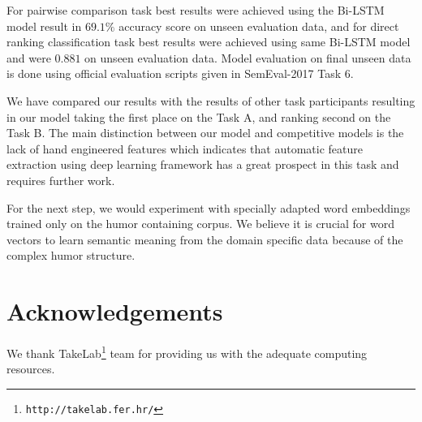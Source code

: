 \documentclass[10pt, a4paper]{article}
\begin{document}
For pairwise comparison task best results were achieved using the Bi-LSTM model
result in $69.1\%$ accuracy score on unseen evaluation data, and for
direct ranking classification task best results were achieved using same
Bi-LSTM model and were $0.881$ on unseen evaluation data. Model
evaluation on final unseen data is done using official evaluation scripts given
in SemEval-2017 Task 6.

We have compared our results with the results of other task participants resulting
in our model taking the first place on the Task A, and ranking second on the Task B.
The main distinction between our model and competitive models is the lack of
hand engineered features which indicates that automatic feature extraction using
deep learning framework has a great prospect in this task and requires further work.

For the next step, we would experiment with specially adapted word embeddings
trained only on the humor containing corpus. We believe it is crucial for word
vectors to learn semantic meaning from the domain specific data because of the
complex humor structure. 

\section*{Acknowledgements}

We thank TakeLab\footnote{\texttt{http://takelab.fer.hr/}} team for providing
us with the adequate computing resources.


 
\end{document}
